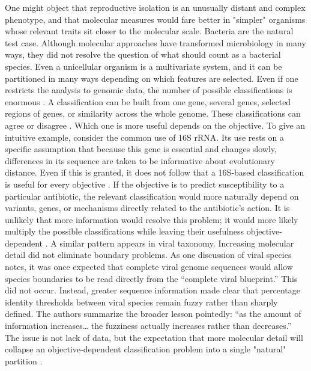 \documentclass[twocolumn]{article} %
\begin{document}
One might object that reproductive isolation is an unusually distant and complex phenotype, and that molecular measures would fare better in "simpler" organisms whose relevant traits sit closer to the molecular scale. Bacteria are the natural test case. Although molecular approaches have transformed microbiology in many ways, they did not resolve the question of what should count as a bacterial species\citep[e]{kunz2013species}. Even a unicellular organism is a multivariate system, and it can be partitioned in many ways depending on which features are selected. Even if one restricts the analysis to genomic data, the number of possible classifications is enormous \citep[b]{simpson1945principles}\citep[d]{kunz2013species}. A classification can be built from one gene, several genes, selected regions of genes, or similarity across the whole genome. These classifications can agree or disagree \citep[a]{hugenholtz1996identifying}. Which one is more useful depends on the objective. To give an intuitive example, consider the common use of 16S rRNA. Its use rests on a specific assumption that because this gene is essential and changes slowly, differences in its sequence are taken to be informative about evolutionary distance. Even if this is granted, it does not follow that a 16S-based classification is useful for every objective \citep[b]{claridge1997species}. If the objective is to predict susceptibility to a particular antibiotic, the relevant classification would more naturally depend on variants, genes, or mechanisms directly related to the antibiotic’s action. It is unlikely that more information would resolve this problem; it would more likely multiply the possible classifications while leaving their usefulness objective-dependent \citep[c]{manhart1992molecular}. A similar pattern appears in viral taxonomy. Increasing molecular detail did not eliminate boundary problems. As one discussion of viral species notes, it was once expected that complete viral genome sequences would allow species boundaries to be read directly from the “complete viral blueprint.” This did not occur. Instead, greater sequence information made clear that percentage identity thresholds between viral species remain fuzzy rather than sharply defined. The authors summarize the broader lesson pointedly: “as the amount of information increases… the fuzziness actually increases rather than decreases.” The issue is not lack of data, but the expectation that more molecular detail will collapse an objective-dependent classification problem into a single "natural" partition \citep[c]{claridge1997species}.
\end{document}
